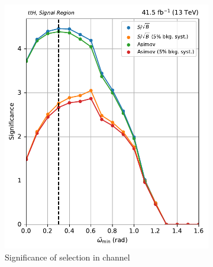 \begin{figure}[htbp]
    \begin{subfigure}[b]{0.46\textwidth}
        \includegraphics[width=\textwidth]{figures/category_optimisations/with_mindphi_cut/significance_ttH_min_omega_tilde_all.pdf}
        \caption{Significance of selection in \ttH channel}
    \end{subfigure}
    \hfill
    \begin{subfigure}[b]{0.46\textwidth}

\end{subfigure}
\end{figure}
